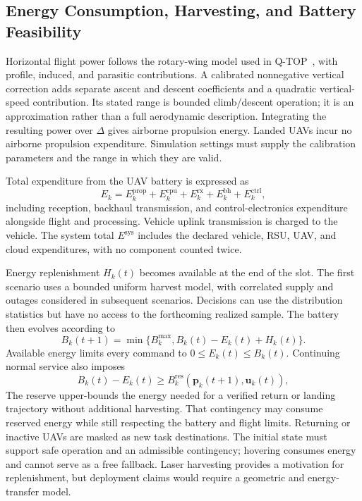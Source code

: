 \documentclass[journal]{IEEEtran}
\begin{document}
\subsection{Energy Consumption, Harvesting, and Battery Feasibility}
Horizontal flight power follows the rotary-wing model used in Q-TOP~\cite{sun2026qtop}, with profile, induced, and parasitic contributions. A calibrated nonnegative vertical correction adds separate ascent and descent coefficients and a quadratic vertical-speed contribution. Its stated range is bounded climb/descent operation; it is an approximation rather than a full aerodynamic description. Integrating the resulting power over $\Delta$ gives airborne propulsion energy. Landed UAVs incur no airborne propulsion expenditure. Simulation settings must supply the calibration parameters and the range in which they are valid.

Total expenditure from the UAV battery is expressed as
\begin{equation}
E_k=E_k^{\mathrm{prop}}+E_k^{\mathrm{cpu}}
 +E_k^{\mathrm{rx}}+E_k^{\mathrm{bh}}+E_k^{\mathrm{ctrl}},
\label{eq:uav_energy}
\end{equation}
including reception, backhaul transmission, and control-electronics expenditure alongside flight and processing. Vehicle uplink transmission is charged to the vehicle. The system total $E^{\mathrm{sys}}$ includes the declared vehicle, RSU, UAV, and cloud expenditures, with no component counted twice.

Energy replenishment $H_k(t)$ becomes available at the end of the slot. The first scenario uses a bounded uniform harvest model, with correlated supply and outages considered in subsequent scenarios. Decisions can use the distribution statistics but have no access to the forthcoming realized sample. The battery then evolves according to
\begin{equation}
B_k(t+1)=\min\{B_k^{\max},B_k(t)-E_k(t)+H_k(t)\}.
\label{eq:battery}
\end{equation}
Available energy limits every command to $0\le E_k(t)\le B_k(t)$. Continuing normal service also imposes
\begin{equation}
B_k(t)-E_k(t)\ge
 B_k^{\mathrm{res}}(\boldsymbol p_k(t+1),\boldsymbol u_k(t)),
\label{eq:reserve}
\end{equation}
The reserve upper-bounds the energy needed for a verified return or landing trajectory without additional harvesting. That contingency may consume reserved energy while still respecting the battery and flight limits. Returning or inactive UAVs are masked as new task destinations. The initial state must support safe operation and an admissible contingency; hovering consumes energy and cannot serve as a free fallback. Laser harvesting provides a motivation for replenishment, but deployment claims would require a geometric and energy-transfer model.
\end{document}
